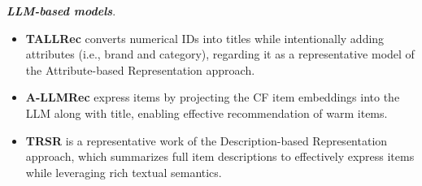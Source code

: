 \documentclass[sigconf]{acmart}
\begin{document}
\smallskip
\textbf{\textit{LLM-based models}}.
\begin{itemize}[leftmargin=5mm]
    \item \textbf{TALLRec} \cite{bao2023tallrec} converts numerical IDs into titles while intentionally adding attributes (i.e., brand and category), regarding it as a representative model of the Attribute-based Representation approach. 
    \item \textbf{A-LLMRec} \cite{kim2024large} express items by projecting the CF item embeddings into the LLM along with title, enabling effective recommendation of warm items.
    \item \textbf{TRSR} \cite{zheng2024harnessing} is a representative work of the Description-based Representation approach, which summarizes full item descriptions to effectively express items while leveraging rich textual semantics.
\end{itemize}


\end{document}
